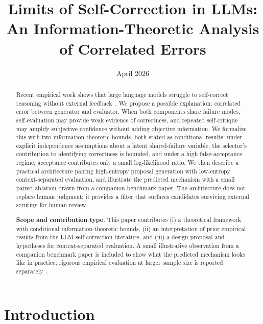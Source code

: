\documentclass[11pt]{article}
\title{Limits of Self-Correction in LLMs:\\
\large An Information-Theoretic Analysis of Correlated Errors}
\date{April 2026}
\begin{document}
\maketitle

\begin{abstract}
Recent empirical work shows that large language models struggle to self-correct reasoning without external feedback~\citep{huang2024selfcorrect}. We propose a possible explanation: correlated error between generator and evaluator. When both components share failure modes, self-evaluation may provide weak evidence of correctness, and repeated self-critique may amplify subjective confidence without adding objective information. We formalize this with two information-theoretic bounds, both stated as conditional results: under explicit independence assumptions about a latent shared-failure variable, the selector's contribution to identifying correctness is bounded, and under a high false-acceptance regime, acceptance contributes only a small log-likelihood ratio. We then describe a practical architecture pairing high-entropy proposal generation with low-entropy context-separated evaluation, and illustrate the predicted mechanism with a small paired ablation drawn from a companion benchmark paper. The architecture does not replace human judgment; it provides a filter that surfaces candidates surviving external scrutiny for human review.

\medskip

\noindent\textbf{Scope and contribution type.} This paper contributes (i) a theoretical framework with conditional information-theoretic bounds, (ii) an interpretation of prior empirical results from the LLM self-correction literature, and (iii) a design proposal and hypotheses for context-separated evaluation. A small illustrative observation from a companion benchmark paper is included to show what the predicted mechanism looks like in practice; rigorous empirical evaluation at larger sample size is reported separately~\citep{brilliant2026benchmark}.
\end{abstract}

\tableofcontents
\newpage

\section{Introduction}
\end{document}

